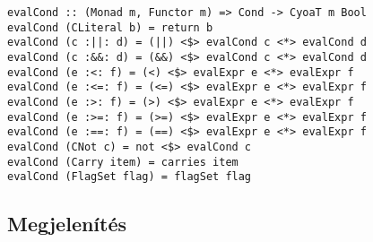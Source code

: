 \documentclass[12pt,a4paper,oneside]{report}
\begin{document}
  \begin{verbatim}
evalCond :: (Monad m, Functor m) => Cond -> CyoaT m Bool
evalCond (CLiteral b) = return b
evalCond (c :||: d) = (||) <$> evalCond c <*> evalCond d
evalCond (c :&&: d) = (&&) <$> evalCond c <*> evalCond d
evalCond (e :<: f) = (<) <$> evalExpr e <*> evalExpr f
evalCond (e :<=: f) = (<=) <$> evalExpr e <*> evalExpr f
evalCond (e :>: f) = (>) <$> evalExpr e <*> evalExpr f
evalCond (e :>=: f) = (>=) <$> evalExpr e <*> evalExpr f
evalCond (e :==: f) = (==) <$> evalExpr e <*> evalExpr f
evalCond (CNot c) = not <$> evalCond c
evalCond (Carry item) = carries item
evalCond (FlagSet flag) = flagSet flag
  \end{verbatim}
    \subsection{Megjelenítés}
\end{document}
